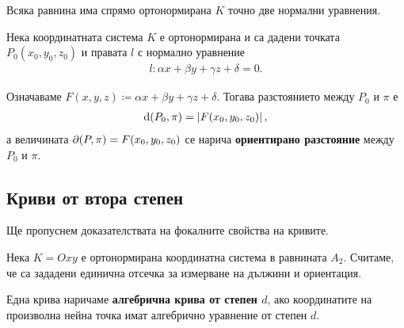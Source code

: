 \documentclass[numbers=endperiod, bibliography=totocnumbered]{scrartcl}
\begin{document}
\begin{proposition}
  Всяка равнина има спрямо ортонормирана \( K \) точно две нормални уравнения.
\end{proposition}

\begin{theorem}
  Нека координатната система \( K \) е ортонормирана и са дадени точката \( P_0(x_0, y_0, z_0) \) и правата \( l \) с нормално уравнение
  \begin{align*}
    l: \alpha x + \beta y + \gamma z + \delta = 0.
  \end{align*}

  Означаваме \( F(x, y, z) \coloneqq \alpha x + \beta y + \gamma z + \delta \). Тогава разстоянието между \( P_0 \) и \( \pi \) е
  \begin{align*}
    \operatorname{d}(P_0, \pi) = \left\vert F(x_0, y_0, z_0) \right\vert,
  \end{align*}
  а величината \( \partial(P, \pi) = F(x_0, y_0, z_0) \) се нарича \textbf{ориентирано разстояние} между \( P_0 \) и \( \pi \).
\end{theorem}

\subsection{Криви от втора степен}

\begin{remark}
  Ще пропуснем доказателствата на фокалните свойства на кривите.
\end{remark}

Нека \( K = Oxy \) е ортонормирана координатна система в равнината \( A_2 \). Считаме, че са зададени единична отсечка за измерване на дължини и ориентация.

\begin{definition}
  Една крива наричаме \textbf{алгебрична крива от степен \( d \)}, ако координатите на произволна нейна точка имат алгебрично уравнение от степен \( d \).
\end{definition}
\end{document}

